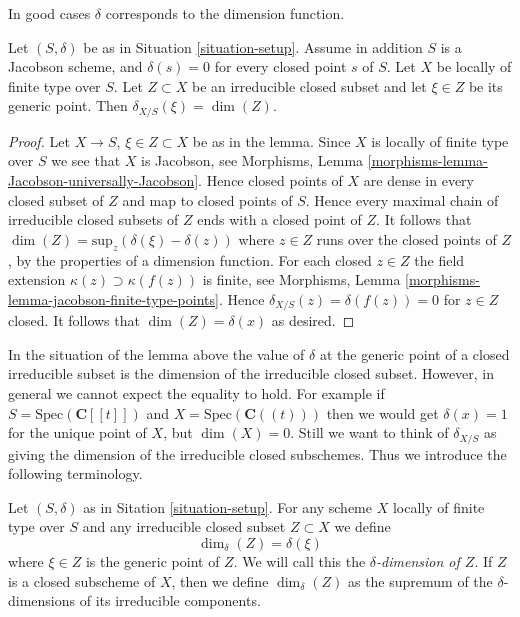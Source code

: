 \noindent
In good cases $\delta$ corresponds to the dimension function.

\begin{lemma}
\label{lemma-delta-is-dimension}
Let $(S, \delta)$ be as in Situation \ref{situation-setup}.
Assume in addition $S$ is a Jacobson scheme, and $\delta(s) = 0$ for every
closed point $s$ of $S$. Let $X$ be locally of finite type over $S$.
Let $Z \subset X$ be an irreducible closed subset and let
$\xi \in Z$ be its generic point.
Then $\delta_{X/S}(\xi) = \dim(Z)$.
\end{lemma}

\begin{proof}
Let $X \to S$, $\xi \in Z \subset X$ be as in the lemma.
Since $X$ is locally of finite type over $S$ we see that
$X$ is Jacobson, see
Morphisms, Lemma \ref{morphisms-lemma-Jacobson-universally-Jacobson}.
Hence closed points of $X$ are dense in every closed subset of $Z$
and map to closed points of $S$. Hence every maximal chain
of irreducible closed subsets of $Z$ ends with a closed point of $Z$.
It follows that $\dim(Z) = \text{sup}_z(\delta(\xi) - \delta(z))$
where $z \in Z$ runs over the closed points of $Z$, by the properties
of a dimension function. For each closed $z \in Z$ the field extension
$\kappa(z) \supset \kappa(f(z))$ is finite, see Morphisms,
Lemma \ref{morphisms-lemma-jacobson-finite-type-points}.
Hence $\delta_{X/S}(z) = \delta(f(z)) = 0$ for $z \in Z$ closed.
It follows that $\dim(Z) = \delta(x)$ as desired.
\end{proof}

\noindent
In the situation of the lemma above the
value of $\delta$ at the generic point of a closed irreducible subset
is the dimension of the irreducible closed subset.
However, in general we cannot expect the equality to hold.
For example if $S = \text{Spec}(\mathbf{C}[[t]])$ and
$X = \text{Spec}(\mathbf{C}((t)))$ then we would get
$\delta(x) = 1$ for the unique point of $X$, but $\dim(X) = 0$.
Still we want to think of $\delta_{X/S}$ as giving the
dimension of the irreducible closed subschemes. Thus we introduce
the following terminology.

\begin{definition}
\label{definition-delta-dimension}
Let $(S, \delta)$ as in Sitation \ref{situation-setup}.
For any scheme $X$ locally of finite type over $S$
and any irreducible closed subset $Z \subset X$ we define
$$
\dim_\delta(Z) = \delta(\xi)
$$
where $\xi \in Z$ is the generic point of $Z$.
We will call this the {\it $\delta$-dimension of $Z$}.
If $Z$ is a closed subscheme of $X$, then we define
$\dim_\delta(Z)$ as the supremum of the $\delta$-dimensions
of its irreducible components.
\end{definition}







